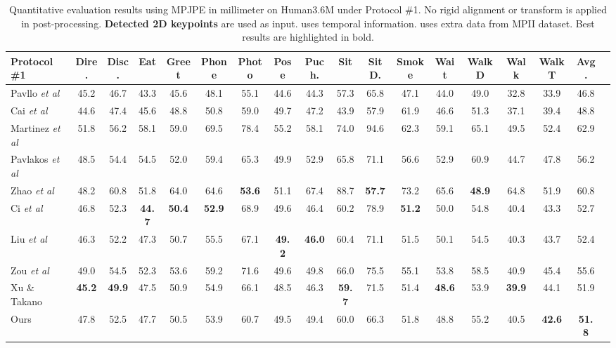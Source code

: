\documentclass{bmvc2k}
\def\etal{\emph{et al}\bmvaOneDot}
\begin{document}
\begin{table}[!t]
\renewcommand{\baselinestretch}{1.0}
\renewcommand{\arraystretch}{1.0}

          
\footnotesize
\centering
\setlength{\tabcolsep}{0.75pt}
\renewcommand{\baselinestretch}{1.0}
\renewcommand\arraystretch{1.0}
\setlength{\abovecaptionskip}{-5pt}
\setlength{\belowcaptionskip}{2pt}
\caption{Quantitative evaluation results using MPJPE in millimeter on Human3.6M under Protocol \#1. No rigid alignment or transform is applied in post-processing. \textbf{Detected 2D keypoints} are used as input.  uses temporal information.  uses extra data from MPII dataset. Best results are highlighted in bold.}\label{table:MPJPE}
\begin{tabular}{lccccccccccccccccc}
\hline
\textbf{Protocol \#1}&Dire.&Disc.&Eat&Greet&Phone&Photo&Pose&Puch.&Sit&SitD.&Smoke&Wait&WalkD&Walk&WalkT&\textbf{Avg.} \\ \hline
Pavllo \etal~\cite{pavllo20193d}&45.2&46.7 &43.3& 45.6& 48.1& 55.1& 44.6& 44.3& 57.3& 65.8& 47.1& 44.0& 49.0& 32.8& 33.9 &46.8\\ 
Cai \etal~\cite{2019Exploiting} &44.6 &47.4& 45.6& 48.8& 50.8& 59.0&49.7& 47.2& 43.9& 57.9& 61.9&  46.6& 51.3& 37.1& 39.4& 48.8\\ \hline
Martinez \etal~\cite{2017simple} &51.8&56.2&58.1&59.0&69.5&78.4&55.2&58.1&74.0&94.6&62.3&59.1&65.1&49.5&52.4&62.9 \\ 
Pavlakos \etal~\cite{2018Ordinal}&48.5&54.4&54.5&52.0&59.4&65.3&49.9&52.9&65.8&71.1&56.6&52.9&60.9&44.7&47.8&56.2\\  
Zhao \etal \cite{zhao2019semantic} &48.2&60.8&51.8&64.0&64.6&{\bf53.6}&51.1&67.4&88.7&{\bf57.7}&73.2&65.6&{\bf48.9}&64.8&51.9&60.8\\
Ci \etal~\cite{ci2019optimizing}&46.8&52.3&{\bf44.7}&{\bf50.4}&{\bf 52.9}&68.9&49.6&46.4&60.2&78.9&{\bf51.2}&50.0&54.8&40.4 &43.3&52.7 \\
Liu \etal~\cite{liu2020comprehensive}  &46.3 &52.2& 47.3& 50.7& 55.5 &67.1& {\bf49.2}&{\bf46.0}& 60.4 &71.1& 51.5& 50.1& 54.5 &40.3& 43.7& 52.4\\
Zou \etal~\cite{zou2020high} &49.0& 54.5& 52.3& 53.6 &59.2& 71.6& 49.6 &49.8& 66.0 &75.5 &55.1 &53.8& 58.5& 40.9 &45.4 &55.6 \\
Xu \& Takano~\cite{2021Graph} &{\bf 45.2}&  {\bf49.9}& 47.5& 50.9& 54.9&  66.1&   48.5&  46.3&  {\bf59.7}&  71.5&51.4&{\bf48.6}&53.9& {\bf 39.9}& 44.1& 51.9 \\ \hline
Ours&47.8&52.5&47.7&50.5&53.9&60.7&49.5&49.4&60.0&66.3&51.8&48.8&55.2&40.5&{\bf42.6}&{\bf 51.8} \\ 
\hline
\end{tabular}
\end{table}
\end{document}
